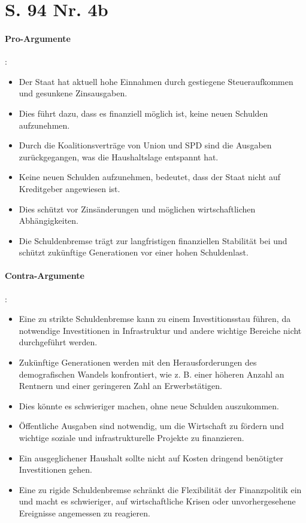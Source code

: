 \documentclass[12pt,a4paper]{report}
\begin{document}
	\section{S. 94 Nr. 4b}
	\paragraph{Pro-Argumente}:
	\begin{itemize}
		\item Der Staat hat aktuell hohe Einnahmen durch gestiegene Steueraufkommen und gesunkene Zinsausgaben.
		\item Dies führt dazu, dass es finanziell möglich ist, keine neuen Schulden aufzunehmen.
		\item Durch die Koalitionsverträge von Union und SPD sind die Ausgaben zurückgegangen, was die Haushaltslage entspannt hat.
		\item Keine neuen Schulden aufzunehmen, bedeutet, dass der Staat nicht auf Kreditgeber angewiesen ist.
		\item Dies schützt vor Zinsänderungen und möglichen wirtschaftlichen Abhängigkeiten.
		\item Die Schuldenbremse trägt zur langfristigen finanziellen Stabilität bei und schützt zukünftige Generationen vor einer hohen Schuldenlast.
	\end{itemize}
	
	\paragraph{Contra-Argumente}:
	\begin{itemize}
		\item Eine zu strikte Schuldenbremse kann zu einem Investitionsstau führen, da notwendige Investitionen in Infrastruktur und andere wichtige Bereiche nicht durchgeführt werden.
		\item Zukünftige Generationen werden mit den Herausforderungen des demografischen Wandels konfrontiert, wie z. B. einer höheren Anzahl an Rentnern und einer geringeren Zahl an Erwerbstätigen.
		\item Dies könnte es schwieriger machen, ohne neue Schulden auszukommen.
		\item Öffentliche Ausgaben sind notwendig, um die Wirtschaft zu fördern und wichtige soziale und infrastrukturelle Projekte zu finanzieren.
		\item Ein ausgeglichener Haushalt sollte nicht auf Kosten dringend benötigter Investitionen gehen.
		\item Eine zu rigide Schuldenbremse schränkt die Flexibilität der Finanzpolitik ein und macht es schwieriger, auf wirtschaftliche Krisen oder unvorhergesehene Ereignisse angemessen zu reagieren.
	\end{itemize}
\end{document}
